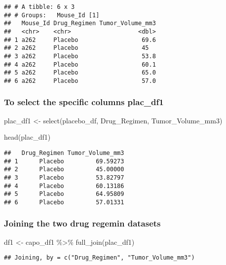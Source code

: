 \documentclass[
]{article}
\newenvironment{Shaded}{\begin{snugshade}}{\end{snugshade}}
\newcommand{\FunctionTok}[1]{\textcolor[rgb]{0.00,0.00,0.00}{#1}}
\newcommand{\NormalTok}[1]{#1}
\newcommand{\OtherTok}[1]{\textcolor[rgb]{0.56,0.35,0.01}{#1}}
\newcommand{\SpecialCharTok}[1]{\textcolor[rgb]{0.00,0.00,0.00}{#1}}
\begin{document}
\begin{verbatim}
## # A tibble: 6 x 3
## # Groups:   Mouse_Id [1]
##   Mouse_Id Drug_Regimen Tumor_Volume_mm3
##   <chr>    <chr>                   <dbl>
## 1 a262     Placebo                  69.6
## 2 a262     Placebo                  45  
## 3 a262     Placebo                  53.8
## 4 a262     Placebo                  60.1
## 5 a262     Placebo                  65.0
## 6 a262     Placebo                  57.0
\end{verbatim}

\hypertarget{to-select-the-specific-columns-plac_df1}{%
\subsubsection{To select the specific columns
plac\_df1}\label{to-select-the-specific-columns-plac_df1}}

\begin{Shaded}
\begin{Highlighting}[]
\NormalTok{plac\_df1 }\OtherTok{\textless{}{-}} \FunctionTok{select}\NormalTok{(placebo\_df, Drug\_Regimen, Tumor\_Volume\_mm3)}

\FunctionTok{head}\NormalTok{(plac\_df1)}
\end{Highlighting}
\end{Shaded}

\begin{verbatim}
##   Drug_Regimen Tumor_Volume_mm3
## 1      Placebo         69.59273
## 2      Placebo         45.00000
## 3      Placebo         53.82797
## 4      Placebo         60.13186
## 5      Placebo         64.95809
## 6      Placebo         57.01331
\end{verbatim}

\hypertarget{joining-the-two-drug-regemin-datasets}{%
\subsubsection{Joining the two drug regemin
datasets}\label{joining-the-two-drug-regemin-datasets}}

\begin{Shaded}
\begin{Highlighting}[]
\NormalTok{df1 }\OtherTok{\textless{}{-}}\NormalTok{ capo\_df1 }\SpecialCharTok{\%\textgreater{}\%} \FunctionTok{full\_join}\NormalTok{(plac\_df1)}
\end{Highlighting}
\end{Shaded}

\begin{verbatim}
## Joining, by = c("Drug_Regimen", "Tumor_Volume_mm3")
\end{verbatim}
\end{document}
